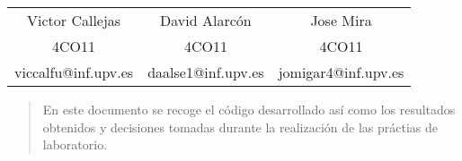 \vfill
{
    \maketitle
    \vspace{1cm}
    \begin{center}
    \begin{tabular}{c c c}
        Victor Callejas &  David Alarcón & Jose Mira\\
        \small 4CO11 & 4CO11 & 4CO11 \\
        \small viccalfu@inf.upv.es & daalse1@inf.upv.es & jomigar4@inf.upv.es \\
    \end{tabular}
    \end{center}
    \vspace{1cm}
    \begin{abstract}
        \center En este documento se recoge el código desarrollado así como los resultados obtenidos y decisiones tomadas durante la realización de las práctias de laboratorio.
    \end{abstract}

    \newpage
}